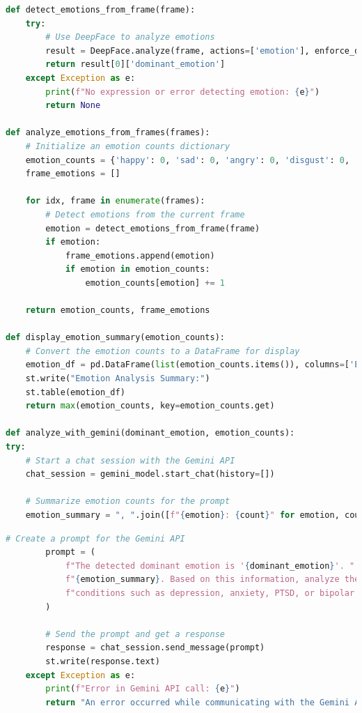 \begin{tcolorbox}[colback=gray!5!white, colframe=gray!80!black, boxrule=0.5pt, title=Emotion Analysis and Mental Health Insights]
    \begin{lstlisting}[language=Python]
def detect_emotions_from_frame(frame):
    try:
        # Use DeepFace to analyze emotions
        result = DeepFace.analyze(frame, actions=['emotion'], enforce_detection=False)
        return result[0]['dominant_emotion']
    except Exception as e:
        print(f"No expression or error detecting emotion: {e}")
        return None

def analyze_emotions_from_frames(frames):
    # Initialize an emotion counts dictionary
    emotion_counts = {'happy': 0, 'sad': 0, 'angry': 0, 'disgust': 0, 'fear': 0, 'surprise': 0, 'neutral': 0}
    frame_emotions = []

    for idx, frame in enumerate(frames):
        # Detect emotions from the current frame
        emotion = detect_emotions_from_frame(frame)
        if emotion:
            frame_emotions.append(emotion)
            if emotion in emotion_counts:
                emotion_counts[emotion] += 1

    return emotion_counts, frame_emotions

def display_emotion_summary(emotion_counts):
    # Convert the emotion counts to a DataFrame for display
    emotion_df = pd.DataFrame(list(emotion_counts.items()), columns=['Emotion', 'Count'])
    st.write("Emotion Analysis Summary:")
    st.table(emotion_df)
    return max(emotion_counts, key=emotion_counts.get)

def analyze_with_gemini(dominant_emotion, emotion_counts):
try:
    # Start a chat session with the Gemini API
    chat_session = gemini_model.start_chat(history=[])

    # Summarize emotion counts for the prompt
    emotion_summary = ", ".join([f"{emotion}: {count}" for emotion, count in emotion_counts.items()])
    \end{lstlisting}
\end{tcolorbox}
\begin{tcolorbox}[colback=gray!5!white, colframe=gray!80!black, boxrule=0.5pt, title=Emotion Analysis and Mental Health Insights]
    \begin{lstlisting}[language=Python]
        # Create a prompt for the Gemini API
        prompt = (
            f"The detected dominant emotion is '{dominant_emotion}'. "
            f"{emotion_summary}. Based on this information, analyze the potential implications for mental health "
            f"conditions such as depression, anxiety, PTSD, or bipolar disorder. Provide actionable insights in three lines."
        )

        # Send the prompt and get a response
        response = chat_session.send_message(prompt)
        st.write(response.text)
    except Exception as e:
        print(f"Error in Gemini API call: {e}")
        return "An error occurred while communicating with the Gemini API. Please try again later."
    \end{lstlisting}
\end{tcolorbox}

